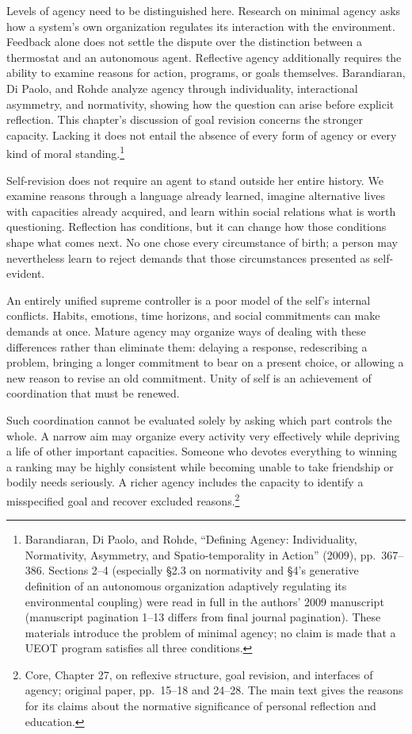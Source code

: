 \documentclass[
  english,
  11pt,
  oneside]{book}
\begin{document}
Levels of agency need to be distinguished here. Research on minimal agency asks how a system's own organization regulates its interaction with the environment. Feedback alone does not settle the dispute over the distinction between a thermostat and an autonomous agent. Reflective agency additionally requires the ability to examine reasons for action, programs, or goals themselves. Barandiaran, Di Paolo, and Rohde analyze agency through individuality, interactional asymmetry, and normativity, showing how the question can arise before explicit reflection. This chapter's discussion of goal revision concerns the stronger capacity. Lacking it does not entail the absence of every form of agency or every kind of moral standing.\footnote{\hypertarget{ph-note-39}{}Barandiaran, Di Paolo, and Rohde, ``Defining Agency: Individuality, Normativity, Asymmetry, and Spatio-temporality in Action'' (2009), pp.~367--386. Sections 2--4 (especially §2.3 on normativity and §4's generative definition of an autonomous organization adaptively regulating its environmental coupling) were read in full in the authors' 2009 manuscript (manuscript pagination 1--13 differs from final journal pagination). These materials introduce the problem of minimal agency; no claim is made that a UEOT program satisfies all three conditions.}

Self-revision does not require an agent to stand outside her entire history. We examine reasons through a language already learned, imagine alternative lives with capacities already acquired, and learn within social relations what is worth questioning. Reflection has conditions, but it can change how those conditions shape what comes next. No one chose every circumstance of birth; a person may nevertheless learn to reject demands that those circumstances presented as self-evident.

An entirely unified supreme controller is a poor model of the self's internal conflicts. Habits, emotions, time horizons, and social commitments can make demands at once. Mature agency may organize ways of dealing with these differences rather than eliminate them: delaying a response, redescribing a problem, bringing a longer commitment to bear on a present choice, or allowing a new reason to revise an old commitment. Unity of self is an achievement of coordination that must be renewed.

Such coordination cannot be evaluated solely by asking which part controls the whole. A narrow aim may organize every activity very effectively while depriving a life of other important capacities. Someone who devotes everything to winning a ranking may be highly consistent while becoming unable to take friendship or bodily needs seriously. A richer agency includes the capacity to identify a misspecified goal and recover excluded reasons.\footnote{\hypertarget{ph-note-40}{}Core, Chapter 27, on reflexive structure, goal revision, and interfaces of agency; original paper, pp.~15--18 and 24--28. The main text gives the reasons for its claims about the normative significance of personal reflection and education.}
\end{document}
